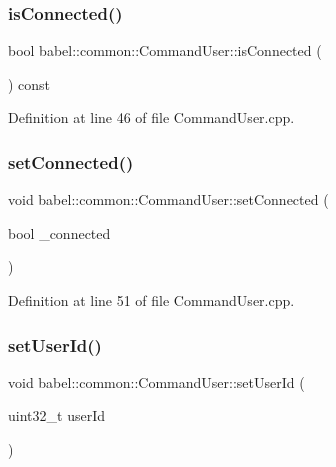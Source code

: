 \subsubsection{\texorpdfstring{is\+Connected()}{isConnected()}}
{\footnotesize\ttfamily bool babel\+::common\+::\+Command\+User\+::is\+Connected (\begin{DoxyParamCaption}{ }\end{DoxyParamCaption}) const}



Definition at line 46 of file Command\+User.\+cpp.

\mbox{\label{classbabel_1_1common_1_1_command_user_ab591e093d01b3fa143d2ef45dd9243f9}} 
\subsubsection{\texorpdfstring{set\+Connected()}{setConnected()}}
{\footnotesize\ttfamily void babel\+::common\+::\+Command\+User\+::set\+Connected (\begin{DoxyParamCaption}\item[{bool}]{\+\_\+connected }\end{DoxyParamCaption})}



Definition at line 51 of file Command\+User.\+cpp.

\mbox{\label{classbabel_1_1common_1_1_command_user_a9ab2ea2584246c996e634838ee0f6444}} 
\subsubsection{\texorpdfstring{set\+User\+Id()}{setUserId()}}
{\footnotesize\ttfamily void babel\+::common\+::\+Command\+User\+::set\+User\+Id (\begin{DoxyParamCaption}\item[{uint32\+\_\+t}]{user\+Id }\end{DoxyParamCaption})}



